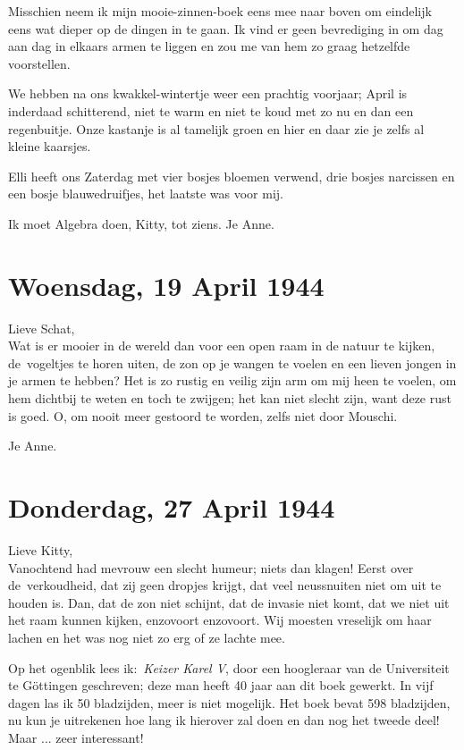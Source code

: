 \documentclass{book}
\begin{document}
Misschien neem ik mijn mooie-zinnen-boek eens mee naar boven om
eindelijk eens wat dieper op de dingen in te gaan. Ik vind er geen
bevrediging in om dag aan dag in elkaars armen te liggen en zou me van
hem zo graag hetzelfde voorstellen.

We hebben na ons kwakkel-wintertje weer een prachtig voorjaar; April is
inderdaad schitterend, niet te warm en niet te koud met zo nu en dan een
regenbuitje. Onze kastanje is al tamelijk groen en hier en daar zie je
zelfs al kleine kaarsjes.

Elli heeft ons Zaterdag met vier bosjes bloemen verwend, drie bosjes
narcissen en een bosje blauwedruifjes, het laatste was voor mij.

Ik moet Algebra doen, Kitty, tot ziens. Je Anne.

\chapter{Woensdag, 19 April 1944}

Lieve Schat,\\Wat is er mooier in de wereld dan voor een open raam in de
natuur te kijken, de~vogeltjes te horen uiten, de zon op je wangen te
voelen en een lieven jongen in je armen te hebben? Het is zo rustig en
veilig zijn arm om mij heen te voelen, om hem dichtbij te weten en toch
te zwijgen; het kan niet slecht zijn, want deze rust is goed. O, om
nooit meer gestoord te worden, zelfs niet door Mouschi.

Je Anne.

\chapter{Donderdag, 27 April 1944}

Lieve Kitty,\\Vanochtend had mevrouw een slecht humeur; niets dan
klagen! Eerst over de~verkoudheid, dat zij geen dropjes krijgt, dat veel
neussnuiten niet om uit te houden is. Dan, dat de zon niet schijnt, dat
de invasie niet komt, dat we niet uit het raam kunnen kijken, enzovoort
enzovoort. Wij moesten vreselijk om haar lachen en het was nog niet zo
erg of ze lachte mee.

Op het ogenblik lees ik:~\emph{Keizer Karel V}, door een hoogleraar van
de Universiteit te Göttingen geschreven; deze man heeft 40 jaar aan dit
boek gewerkt. In vijf dagen las ik 50 bladzijden, meer is niet mogelijk.
Het boek bevat 598 bladzijden, nu kun je uitrekenen hoe lang ik hierover
zal doen en dan nog het tweede deel! Maar ... zeer interessant!
\end{document}
